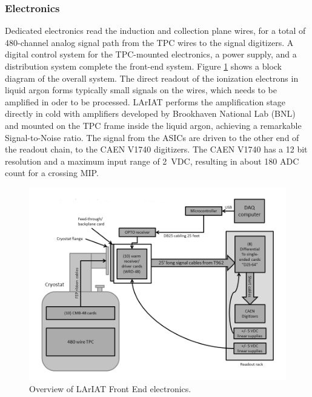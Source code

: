 \subsubsection{Electronics}

Dedicated electronics read the induction and collection plane wires, for a total of  480-channel analog signal path from the TPC wires to the signal digitizers. A digital control system for the TPC-mounted electronics, a power supply, and a distribution system complete the front-end system. Figure \ref{pic:FEelectronics} shows a block diagram of the overall system. The direct readout of the ionization electrons in liquid argon forms typically small signals on the wires, which needs to be amplified in oder to be processed. LArIAT  performs the amplification stage directly in cold with  amplifiers developed by Brookhaven National Lab (BNL) and mounted on the TPC frame inside the liquid argon, achieving a remarkable Signal-to-Noise ratio. %
The signal from the ASICs are driven to the other end of the readout chain, to the CAEN V1740 digitizers. The CAEN V1740 has a 12 bit resolution and a maximum input range of 2~VDC, resulting in about 180 ADC count for a crossing MIP.   

\begin{figure}[htbp]
 \centering
 \includegraphics[width=1.0\textwidth]{Chapter-3/Images/LArIAT_FE_Electronics.png}
\caption{Overview of LArIAT Front End electronics. } 
\label{pic:FEelectronics}
\end{figure}




